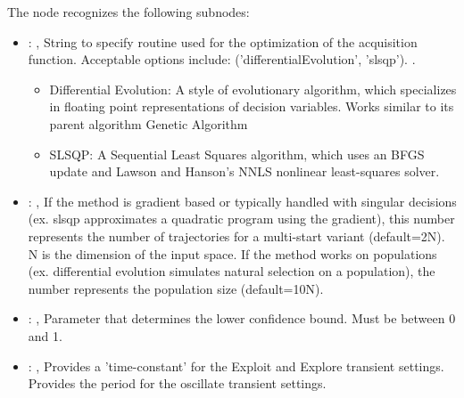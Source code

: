 \begin{itemize}
\begin{itemize}
          The  node recognizes the following subnodes:
          \begin{itemize}
            \item {}: ,
              String to specify routine used for the optimization of the acquisition function.
              Acceptable options include: ('differentialEvolution', 'slsqp').
              .
              \begin{itemize}                                                  \item Differential
              Evolution: A style of evolutionary algorithm, which specializes in floating point
              representations of decision variables. Works similar to its parent algorithm Genetic
              Algorithm                                                  \item SLSQP: A Sequential
              Least Squares algorithm, which uses an BFGS update and
              Lawson and Hanson’s NNLS nonlinear least-squares solver.
              \end{itemize}

            \item {}: ,
              If the method is gradient based or typically handled with singular
              decisions (ex. slsqp approximates a quadratic program using the gradient), this number
              represents the number of trajectories for a multi-start variant (default=2N).
              N is the dimension of the input space.
              If the method works on populations (ex. differential evolution simulates
              natural selection on a population),
              the number represents the population size (default=10N).

            \item {}: ,
              Parameter that determines the lower confidence bound. Must be
              between 0 and 1.

            \item {}: ,
              Provides a 'time-constant' for the Exploit and Explore transient settings.
              Provides the period for the oscillate transient settings.


\end{itemize}
\end{itemize}
\end{itemize}
